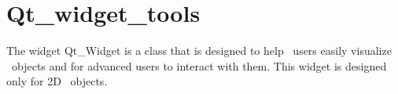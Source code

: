 
\section{Qt\_widget\_tools}
\label{Qt_widget_tools}


\ccDefinition

The widget Qt\_Widget is a class that is designed to help \cgal\ users easily 
visualize \cgal\ objects and for advanced users to interact with them. This 
widget is designed only for 2D \cgal\ objects.










